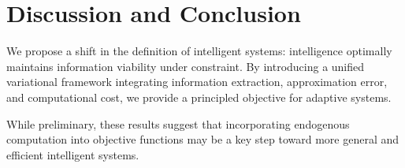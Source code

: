 \documentclass{article}
\begin{document}
\section{Discussion and Conclusion}

We propose a shift in the definition of intelligent systems: intelligence optimally maintains information viability under constraint. By introducing a unified variational framework integrating information extraction, approximation error, and computational cost, we provide a principled objective for adaptive systems.

While preliminary, these results suggest that incorporating endogenous computation into objective functions may be a key step toward more general and efficient intelligent systems.
\end{document}
